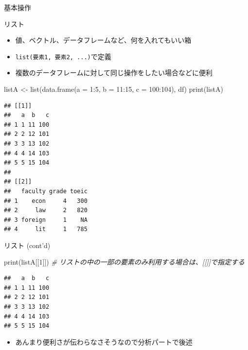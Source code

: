 \documentclass[
  ignorenonframetext,
]{beamer}
\newenvironment{Shaded}{\begin{snugshade}}{\end{snugshade}}
\newcommand{\AttributeTok}[1]{\textcolor[rgb]{0.77,0.63,0.00}{#1}}
\newcommand{\CommentTok}[1]{\textcolor[rgb]{0.56,0.35,0.01}{\textit{#1}}}
\newcommand{\DecValTok}[1]{\textcolor[rgb]{0.00,0.00,0.81}{#1}}
\newcommand{\FunctionTok}[1]{\textcolor[rgb]{0.00,0.00,0.00}{#1}}
\newcommand{\NormalTok}[1]{#1}
\newcommand{\OtherTok}[1]{\textcolor[rgb]{0.56,0.35,0.01}{#1}}
\newcommand{\SpecialCharTok}[1]{\textcolor[rgb]{0.00,0.00,0.00}{#1}}
\providecommand{\tightlist}{%
  \setlength{\itemsep}{0pt}\setlength{\parskip}{0pt}}
\begin{document}
\begin{frame}[fragile]{基本操作}
\begin{block}{リスト}
\protect\hypertarget{ux30eaux30b9ux30c8}{}
\begin{itemize}
\tightlist
\item
  値、ベクトル、データフレームなど、何を入れてもいい箱
\item
  \texttt{list(要素1,\ 要素2,\ ...)}で定義
\item
  複数のデータフレームに対して同じ操作をしたい場合などに便利
\end{itemize}

\begin{Shaded}
\begin{Highlighting}[]
\NormalTok{listA }\OtherTok{\textless{}{-}} \FunctionTok{list}\NormalTok{(}\FunctionTok{data.frame}\NormalTok{(}\AttributeTok{a =} \DecValTok{1}\SpecialCharTok{:}\DecValTok{5}\NormalTok{, }\AttributeTok{b =} \DecValTok{11}\SpecialCharTok{:}\DecValTok{15}\NormalTok{, }\AttributeTok{c =} \DecValTok{100}\SpecialCharTok{:}\DecValTok{104}\NormalTok{), df)}
\FunctionTok{print}\NormalTok{(listA)}
\end{Highlighting}
\end{Shaded}

\begin{verbatim}
## [[1]]
##   a  b   c
## 1 1 11 100
## 2 2 12 101
## 3 3 13 102
## 4 4 14 103
## 5 5 15 104
## 
## [[2]]
##   faculty grade toeic
## 1    econ     4   300
## 2     law     2   820
## 3 foreign     1    NA
## 4     lit     1   785
\end{verbatim}
\end{block}

\begin{block}{リスト (cont'd)}
\protect\hypertarget{ux30eaux30b9ux30c8-contd}{}
\begin{Shaded}
\begin{Highlighting}[]
\FunctionTok{print}\NormalTok{(listA[[}\DecValTok{1}\NormalTok{]]) }\CommentTok{\# リストの中の一部の要素のみ利用する場合は、[[]]で指定する}
\end{Highlighting}
\end{Shaded}

\begin{verbatim}
##   a  b   c
## 1 1 11 100
## 2 2 12 101
## 3 3 13 102
## 4 4 14 103
## 5 5 15 104
\end{verbatim}

\begin{itemize}
\tightlist
\item
  あんまり便利さが伝わらなさそうなので分析パートで後述
\end{itemize}
\end{block}


\end{frame}
\end{document}
